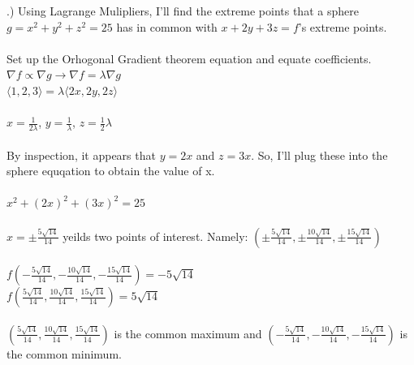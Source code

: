 \documentclass[12pt]{article}
\begin{document}
.) Using Lagrange Mulipliers, I'll find the extreme points that a sphere $g = x^{2} + y^{2} + z^{2} = 25$ has in common with $ x+2y + 3z =f$'s extreme points.\\\\
\noindent Set up the Orhogonal Gradient theorem equation and equate coefficients. \\
\noindent $\nabla f \propto \nabla g \rightarrow \nabla f = \lambda \nabla g$\\
\noindent $ \langle 1, 2, 3\rangle = \lambda \langle 2x, 2y, 2z\rangle$\\\\
\noindent $x = \frac{1}{2\lambda}$, \hspace{10pt} $y = \frac{1}{\lambda}$, \hspace{10pt} $z = \frac{1}{2}\lambda$\\\\
\noindent By inspection, it appears that $y = 2x$ and $z = 3x$. So, I'll plug these into the sphere equqation to obtain the value of x.\\\\
\noindent $x^{2} + (2x)^{2} + (3x)^{2} = 25$\\\\
\noindent $x = \pm \frac{5\sqrt{14}}{14}$ yeilds two points of interest. Namely: $(\pm \frac{5\sqrt{14}}{14}, \pm \frac{10\sqrt{14}}{14}, \pm \frac{15\sqrt{14}}{14})$\\\\
\noindent $f(- \frac{5\sqrt{14}}{14}, - \frac{10\sqrt{14}}{14},  -\frac{15\sqrt{14}}{14}) = -5\sqrt{14}$\\
\noindent $f( \frac{5\sqrt{14}}{14},  \frac{10\sqrt{14}}{14},  \frac{15\sqrt{14}}{14}) = 5\sqrt{14}$\\\\
\noindent $(\frac{5\sqrt{14}}{14},  \frac{10\sqrt{14}}{14},  \frac{15\sqrt{14}}{14})$ is the common maximum and $(- \frac{5\sqrt{14}}{14}, - \frac{10\sqrt{14}}{14},  -\frac{15\sqrt{14}}{14})$ is the common minimum. \clearpage
\end{document}
